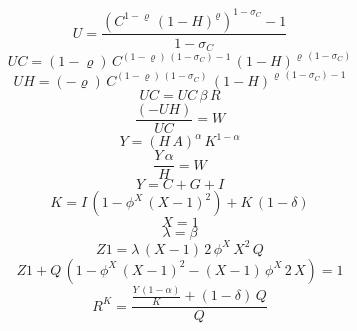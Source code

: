 \begin{dmath}
{U}=\frac{\left({C}^{1-{{\varrho}}}\, \left(1-{H}\right)^{{{\varrho}}}\right)^{1-{{\sigma_{C}}}}-1}{1-{{\sigma_{C}}}}
\end{dmath}
\begin{dmath}
{UC}=\left(1-{{\varrho}}\right)\, {C}^{\left(1-{{\varrho}}\right)\, \left(1-{{\sigma_{C}}}\right)-1}\, \left(1-{H}\right)^{{{\varrho}}\, \left(1-{{\sigma_{C}}}\right)}
\end{dmath}
\begin{dmath}
{UH}=\left(-{{\varrho}}\right)\, {C}^{\left(1-{{\varrho}}\right)\, \left(1-{{\sigma_{C}}}\right)}\, \left(1-{H}\right)^{{{\varrho}}\, \left(1-{{\sigma_{C}}}\right)-1}
\end{dmath}
\begin{dmath}
{UC}={UC}\, {{\beta}}\, {R}
\end{dmath}
\begin{dmath}
\frac{\left(-{UH}\right)}{{UC}}={W}
\end{dmath}
\begin{dmath}
{Y}=\left({H}\, {A}\right)^{{{\alpha}}}\, {K}^{1-{{\alpha}}}
\end{dmath}
\begin{dmath}
\frac{{Y}\, {{\alpha}}}{{H}}={W}
\end{dmath}
\begin{dmath}
{Y}={C}+{G}+{I}
\end{dmath}
\begin{dmath}
{K}={I}\, \left(1-{{\phi^X}}\, \left({X}-1\right)^{2}\right)+{K}\, \left(1-{{\delta}}\right)
\end{dmath}
\begin{dmath}
{X}=1
\end{dmath}
\begin{dmath}
{\lambda}={{\beta}}
\end{dmath}
\begin{dmath}
{Z1}={\lambda}\, \left({X}-1\right)\, 2\, {{\phi^X}}\, {X}^{2}\, {Q}
\end{dmath}
\begin{dmath}
{Z1}+{Q}\, \left(1-{{\phi^X}}\, \left({X}-1\right)^{2}-\left({X}-1\right)\, {{\phi^X}}\, 2\, {X}\right)=1
\end{dmath}
\begin{dmath}
{R^{K}}=\frac{\frac{{Y}\, \left(1-{{\alpha}}\right)}{{K}}+\left(1-{{\delta}}\right)\, {Q}}{{Q}}
\end{dmath}
